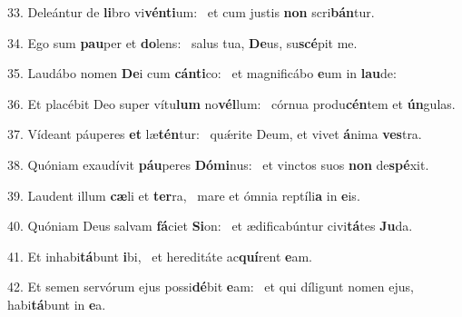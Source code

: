 33. Deleántur de \textbf{li}bro vi\textbf{vén}\textbf{ti}um: \ast\  et cum justis \textbf{non} scri\textbf{bán}tur.\

34. Ego sum \textbf{pau}per et \textbf{do}lens: \ast\  salus tua, \textbf{De}us, su\textbf{scé}pit me.\

35. Laudábo nomen \textbf{De}i cum \textbf{cán}\textbf{ti}co: \ast\  et magnificábo \textbf{e}um in \textbf{lau}de:\

36. Et placébit Deo super vítu\textbf{lum} no\textbf{vél}lum: \ast\  córnua produ\textbf{cén}tem et \textbf{ún}gulas.\

37. Vídeant páuperes \textbf{et} læ\textbf{tén}tur: \ast\  quǽrite Deum, et vivet \textbf{á}nima \textbf{ves}tra.\

38. Quóniam exaudívit \textbf{páu}peres \textbf{Dó}\textbf{mi}nus: \ast\  et vinctos suos \textbf{non} de\textbf{spé}xit.\

39. Laudent illum \textbf{cæ}li et \textbf{ter}ra, \ast\  mare et ómnia reptíli\textbf{a} in \textbf{e}is.\

40. Quóniam Deus salvam \textbf{fá}ciet \textbf{Si}on: \ast\  et ædificabúntur civi\textbf{tá}tes \textbf{Ju}da.\

41. Et inhabi\textbf{tá}bunt \textbf{i}bi, \ast\  et hereditáte ac\textbf{quí}rent \textbf{e}am.\

42. Et semen servórum ejus possi\textbf{dé}bit \textbf{e}am: \ast\  et qui díligunt nomen ejus, habi\textbf{tá}bunt in \textbf{e}a.\

